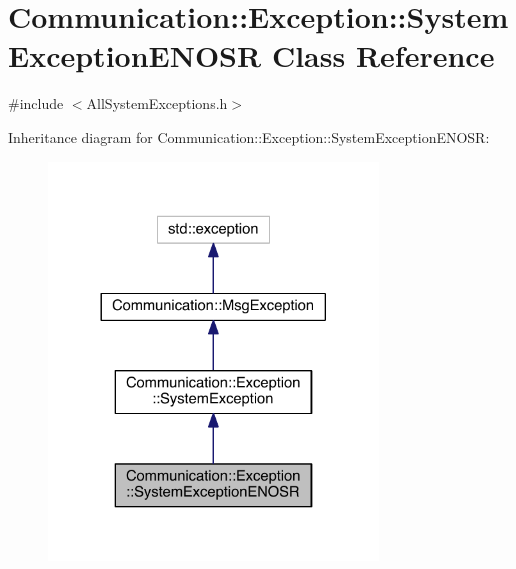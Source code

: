 \hypertarget{class_communication_1_1_exception_1_1_system_exception_e_n_o_s_r}{}\section{Communication\+:\+:Exception\+:\+:System\+Exception\+E\+N\+O\+S\+R Class Reference}
\label{class_communication_1_1_exception_1_1_system_exception_e_n_o_s_r}


{\ttfamily \#include $<$All\+System\+Exceptions.\+h$>$}



Inheritance diagram for Communication\+:\+:Exception\+:\+:System\+Exception\+E\+N\+O\+S\+R\+:\nopagebreak
\begin{figure}[H]
\begin{center}
\leavevmode
\includegraphics[width=248pt]{class_communication_1_1_exception_1_1_system_exception_e_n_o_s_r__inherit__graph}
\end{center}
\end{figure}


